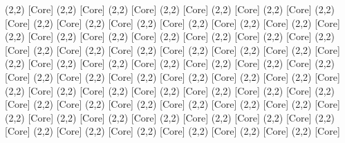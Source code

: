 {(2,2) [Core] %
(2,2) [Core] %
(2,2) [Core] %
(2,2) [Core] %
(2,2) [Core] %
(2,2) [Core] %
(2,2) [Core] %
(2,2) [Core] %
(2,2) [Core] %
(2,2) [Core] %
(2,2) [Core] %
(2,2) [Core] %
(2,2) [Core] %
(2,2) [Core] %
(2,2) [Core] %
(2,2) [Core] %
(2,2) [Core] %
(2,2) [Core] %
(2,2) [Core] %
(2,2) [Core] %
(2,2) [Core] %
(2,2) [Core] %
(2,2) [Core] %
(2,2) [Core] %
(2,2) [Core] %
(2,2) [Core] %
(2,2) [Core] %
(2,2) [Core] %
(2,2) [Core] %
(2,2) [Core] %
(2,2) [Core] %
(2,2) [Core] %
(2,2) [Core] %
(2,2) [Core] %
(2,2) [Core] %
(2,2) [Core] %
(2,2) [Core] %
(2,2) [Core] %
(2,2) [Core] %
(2,2) [Core] %
(2,2) [Core] %
(2,2) [Core] %
(2,2) [Core] %
(2,2) [Core] %
(2,2) [Core] %
(2,2) [Core] %
(2,2) [Core] %
(2,2) [Core] %
(2,2) [Core] %
(2,2) [Core] %
(2,2) [Core] %
(2,2) [Core] %
(2,2) [Core] %
(2,2) [Core] %
(2,2) [Core] %
(2,2) [Core] %
(2,2) [Core] %
(2,2) [Core] %
(2,2) [Core] %
(2,2) [Core] %
(2,2) [Core] %
(2,2) [Core] %
(2,2) [Core] %
(2,2) [Core] %
(2,2) [Core] %
}
